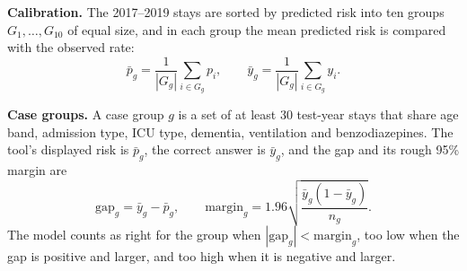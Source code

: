 \documentclass[11pt]{article}
\begin{document}
\textbf{Calibration.} The 2017--2019 stays are sorted by predicted risk into ten groups $G_1, \dots, G_{10}$ of equal size, and in each group the mean predicted risk is compared with the observed rate:
\begin{equation*}
	\bar{p}_g = \frac{1}{|G_g|} \sum_{i \in G_g} p_i , \qquad \bar{y}_g = \frac{1}{|G_g|} \sum_{i \in G_g} y_i .
\end{equation*}

\textbf{Case groups.} A case group $g$ is a set of at least 30 test-year stays that share age band, admission type, ICU type, dementia, ventilation and benzodiazepines. The tool's displayed risk is $\bar{p}_g$, the correct answer is $\bar{y}_g$, and the gap and its rough 95\% margin are
\begin{equation*}
	\text{gap}_g = \bar{y}_g - \bar{p}_g , \qquad \text{margin}_g = 1.96 \sqrt{\frac{\bar{y}_g (1 - \bar{y}_g)}{n_g}} .
\end{equation*}
The model counts as right for the group when $|\text{gap}_g| < \text{margin}_g$, too low when the gap is positive and larger, and too high when it is negative and larger.
\end{document}
